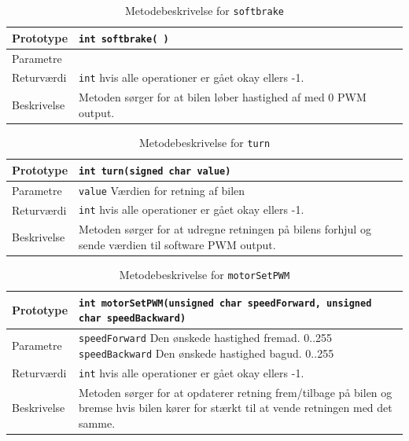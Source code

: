 \begin{table}[H]
	\begin{tabularx}{\textwidth}{| L{2.5 cm} | Z |} \hline
		Prototype & \texttt{int softbrake( )} \\\hline
		Parametre & 
		\\\hline
		Returværdi &  \texttt{int}  hvis alle operationer er gået okay ellers -1. \\\hline
		Beskrivelse & Metoden sørger for at bilen løber hastighed af med 0 PWM output. \\\hline
	\end{tabularx}
	\caption{Metodebeskrivelse for \texttt{softbrake}}
	\label{table:met_softbrake}
\end{table}

\begin{table}[H]
	\begin{tabularx}{\textwidth}{| L{2.5 cm} | Z |} \hline
		Prototype & \texttt{int turn(signed char value)} \\\hline
		Parametre & \texttt{value} \newline
		Værdien for retning af bilen
		\\\hline
		Returværdi &  \texttt{int}  hvis alle operationer er gået okay ellers -1. \\\hline
		Beskrivelse & Metoden sørger for at udregne retningen på bilens forhjul og sende værdien til software PWM output. \\\hline
	\end{tabularx}
	\caption{Metodebeskrivelse for \texttt{turn}}
	\label{table:met_turn}
\end{table}

\begin{table}[H]
	\begin{tabularx}{\textwidth}{| L{2.5 cm} | Z |} \hline
		Prototype & \texttt{int motorSetPWM(unsigned char speedForward, unsigned char speedBackward)} \\\hline
		Parametre & \texttt{speedForward} \newline Den ønskede hastighed fremad. 0..255\newline
		\texttt{speedBackward} \newline Den ønskede hastighed bagud. 0..255
		\\\hline
		Returværdi &  \texttt{int}  hvis alle operationer er gået okay ellers -1. \\\hline
		Beskrivelse & Metoden sørger for at opdaterer retning frem/tilbage på bilen og bremse hvis bilen kører for stærkt til at vende retningen med det samme. \\\hline
	\end{tabularx}
	\caption{Metodebeskrivelse for \texttt{motorSetPWM}}
	\label{table:met_motorSetPWM}
\end{table}

